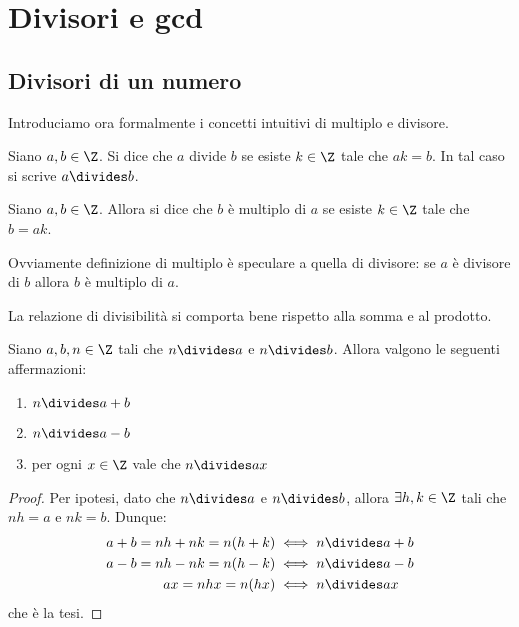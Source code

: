 \chapter{Divisori e gcd}

\section{Divisori di un numero}

Introduciamo ora formalmente i concetti intuitivi di multiplo e divisore.

\begin{definition}[Divisore]
    Siano $a, b \in \Z$. Si dice che $a$ divide $b$ se esiste $k \in \Z$ tale che $ak = b$. In tal caso si scrive $a \divides b$.
\end{definition}

\begin{definition}[Multiplo]
    Siano $a, b \in \Z$. Allora si dice che $b$ è multiplo di $a$ se esiste $k \in \Z$ tale che $b = ak$.
\end{definition}

\begin{remark}
    Ovviamente definizione di multiplo è speculare a quella di divisore: se $a$ è divisore di $b$ allora $b$ è multiplo di $a$.
\end{remark}

La relazione di divisibilità si comporta bene rispetto alla somma e al prodotto. 

\begin{proposition} \label{divides_sum_subtr_mult}
    Siano $a, b, n \in \Z$ tali che $n \divides a$ e $n \divides b$. Allora valgono le seguenti affermazioni:
    \begin{enumerate}
        \item $n \divides a + b$ \label{divides_sum}
        \item $n \divides a - b$ \label{divides_subtr}
        \item per ogni $x \in \Z$ vale che $n \divides ax$ \label{divides_mult}
    \end{enumerate} 
\end{proposition}
\begin{proof}  
    Per ipotesi, dato che $n \divides a$ e $n \divides b$, allora $\exists h, k \in \Z$ tali che
    $nh = a$ e $nk = b$. Dunque:
    \begin{alignat*}{2}
        a + b = nh + nk = n(h + k) &\iff n \divides a + b \\
        a - b = nh - nk = n(h - k) &\iff n \divides a - b \\
        ax = nhx = n(hx) &\iff n \divides ax
    \end{alignat*}
    che è la tesi.
\end{proof}

